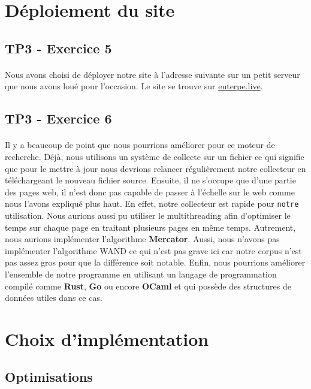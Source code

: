 \documentclass[10pt,a4paper]{article}
\begin{document}
\section{Déploiement du site}
\subsection{TP3 - Exercice 5}
\paragraph{}Nous avons choisi de déployer notre site à l'adresse suivante sur un petit serveur que nous avons loué pour l'occasion. Le site se trouve sur \url{euterpe.live}.

\subsection{TP3 - Exercice 6}
\paragraph{}Il y a beaucoup de point que nous pourrions améliorer pour ce moteur de recherche. Déjà, nous utilisons un système de collecte sur un fichier ce qui signifie que pour le mettre à jour nous devrions relancer régulièrement notre collecteur en téléchargeant le nouveau fichier source. Ensuite, il ne s'occupe que d'une partie des pages web, il n'est donc pas capable de passer à l'échelle sur le web comme nous l'avons expliqué plus haut. En effet, notre collecteur est rapide pour \texttt{notre} utilisation. Nous aurions aussi pu utiliser le multithreading afin d'optimiser le temps sur chaque page en traitant plusieurs pages en même temps. Autrement, nous aurions implémenter l'algorithme \textbf{Mercator}. Aussi, nous n'avons pas implémenter l'algorithme WAND ce qui n'est pas grave ici car notre corpus n'est pas assez gros pour que la différence soit notable. Enfin, nous pourrions améliorer l'ensemble de notre programme en utilisant un langage de programmation compilé comme \textbf{Rust}, \textbf{Go} ou encore \textbf{OCaml} et qui possède des structures de données utiles dans ce cas.




\section{Choix d'implémentation}
\subsection{Optimisations}
\end{document}
